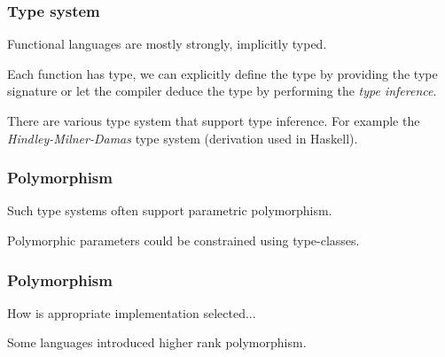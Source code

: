 \documentclass{beamer}
\newcommand{\vpad}{\vspace{5pt}}
\begin{document}

\begin{frame} \frametitle{Type system}
  Functional languages are mostly strongly, implicitly typed.

  \vpad
  Each function has type, we can explicitly define the type by providing the
  type signature or let the compiler deduce the type by performing the
  \textit{type inference}.
  \fplus

  There are various type system that support type inference. For example
  the \textit{Hindley-Milner-Damas} type system (derivation used in Haskell).

\end{frame}





\begin{frame} \frametitle{Polymorphism}
  Such type systems often support parametric polymorphism.
  \begin{block}{}
    \fpolylist
  \end{block}

  Polymorphic parameters could be constrained using type-classes.
  \begin{block}{}
    \fpolyfold
  \end{block}
\end{frame}

\begin{frame} \frametitle{Polymorphism}
  How is appropriate implementation selected...

  Some languages introduced higher rank polymorphism.
  \begin{block}{}
    \fpolyrankn
  \end{block}
\end{frame}
\end{document}
